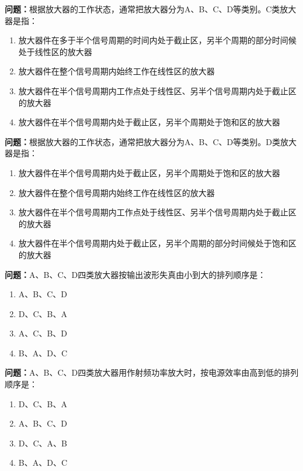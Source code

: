 \bigskip


\noindent\textbf{问题：}根据放大器的工作状态，通常把放大器分为A、B、C、D等类别。C类放大器是指：
\begin{enumerate}[label=\Alph*), leftmargin=3em]
\item 放大器件在多于半个信号周期的时间内处于截止区，另半个周期的部分时间候处于线性区的放大器
\item 放大器件在整个信号周期内始终工作在线性区的放大器
\item 放大器件在半个信号周期内工作点处于线性区、另半个信号周期内处于截止区的放大器
\item 放大器件在半个信号周期内处于截止区，另半个周期处于饱和区的放大器
\end{enumerate}

\bigskip


\noindent\textbf{问题：}根据放大器的工作状态，通常把放大器分为A、B、C、D等类别。D类放大器是指：
\begin{enumerate}[label=\Alph*), leftmargin=3em]
\item 放大器件在半个信号周期内处于截止区，另半个周期处于饱和区的放大器
\item 放大器件在整个信号周期内始终工作在线性区的放大器
\item 放大器件在半个信号周期内工作点处于线性区、另半个信号周期内处于截止区的放大器
\item 放大器件在半个信号周期内处于截止区，另半个周期的部分时间候处于饱和区的放大器
\end{enumerate}

\bigskip


\noindent\textbf{问题：}A、B、C、D四类放大器按输出波形失真由小到大的排列顺序是：
\begin{enumerate}[label=\Alph*), leftmargin=3em]
\item A、B、C、D
\item D、C、B、A
\item A、C、B、D
\item B、A、D、C
\end{enumerate}

\bigskip


\noindent\textbf{问题：}A、B、C、D四类放大器用作射频功率放大时，按电源效率由高到低的排列顺序是：
\begin{enumerate}[label=\Alph*), leftmargin=3em]
\item D、C、B、A
\item A、B、C、D
\item D、C、A、B
\item B、A、D、C
\end{enumerate}

